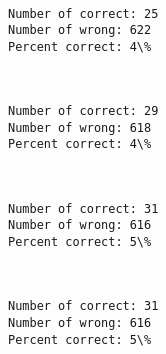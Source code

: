 \documentclass[11pt]{article}
\begin{document}
    \begin{center}
    \end{center}
    { \hspace*{\fill} \\}
    
    \begin{Verbatim}[commandchars=\\\{\}]
Number of correct: 25
Number of wrong: 622
Percent correct: 4\%

    \end{Verbatim}

    \begin{center}
    \end{center}
    { \hspace*{\fill} \\}
    
    \begin{Verbatim}[commandchars=\\\{\}]
Number of correct: 29
Number of wrong: 618
Percent correct: 4\%

    \end{Verbatim}

    \begin{center}
    \end{center}
    { \hspace*{\fill} \\}
    
    \begin{Verbatim}[commandchars=\\\{\}]
Number of correct: 31
Number of wrong: 616
Percent correct: 5\%

    \end{Verbatim}

    \begin{center}
    \end{center}
    { \hspace*{\fill} \\}
    
    \begin{Verbatim}[commandchars=\\\{\}]
Number of correct: 31
Number of wrong: 616
Percent correct: 5\%

    \end{Verbatim}
\end{document}
